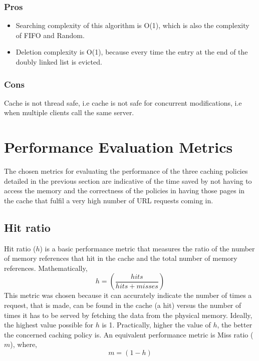 \documentclass[11pt,pdftex,twocolumn]{article}
\begin{document}
\subsubsection{Pros}
\begin{itemize}
	\item Searching complexity of this algorithm is O(1), which is also the complexity of FIFO and Random. 
	\item Deletion complexity is O(1), because every time the entry at the end of the doubly linked list is evicted.
\end{itemize}
\subsubsection{Cons}
Cache is not thread safe, i.e cache is not safe for concurrent modifications, i.e when multiple clients call the same server.

\section{Performance Evaluation Metrics}
\label{sec:perfMetrics}
The chosen metrics for evaluating the performance of the three caching policies detailed in the previous section are indicative of the time saved by not having to access the memory and the correctness of the policies in having those pages in the cache that fulfil a very high number of URL requests coming in.
\subsection{Hit ratio}
Hit ratio ($h$) is a basic performance metric that measures the ratio of the number of memory references that hit in the cache and the total number of memory references.
Mathematically,
\newline
\begin{equation}
\label{eq:h}
h = \left(\frac{hits}{hits + misses}\right)
\end{equation}
This metric was chosen because it can accurately indicate the number of times a request, that is made, can  be found in the cache (a hit) versus the number of times it has to be served by fetching the data from the physical memory. Ideally, the highest value possible for $h$ is 1. Practically, higher the value of $h$, the better the concerned caching policy is.
\newline
An equivalent performance metric is Miss ratio ($m$), where,
\begin{equation}
\label{eq:m}
m = (1 - h)
\end{equation}
\end{document}
